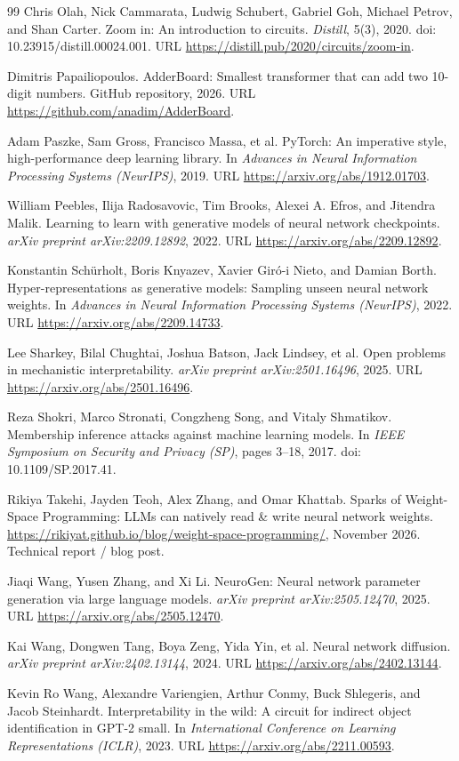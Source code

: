\documentclass[11pt]{article}
\begin{document}
\begin{thebibliography}{99}
 Chris Olah, Nick Cammarata, Ludwig Schubert, Gabriel Goh, Michael Petrov, and Shan Carter. Zoom in: An introduction to circuits. \emph{Distill}, 5(3), 2020. doi: 10.23915/distill.00024.001. URL \url{https://distill.pub/2020/circuits/zoom-in}.

 Dimitris Papailiopoulos. AdderBoard: Smallest transformer that can add two 10-digit numbers. GitHub repository, 2026. URL \url{https://github.com/anadim/AdderBoard}.

 Adam Paszke, Sam Gross, Francisco Massa, et al. PyTorch: An imperative style, high-performance deep learning library. In \emph{Advances in Neural Information Processing Systems (NeurIPS)}, 2019. URL \url{https://arxiv.org/abs/1912.01703}.

 William Peebles, Ilija Radosavovic, Tim Brooks, Alexei A. Efros, and Jitendra Malik. Learning to learn with generative models of neural network checkpoints. \emph{arXiv preprint arXiv:2209.12892}, 2022. URL \url{https://arxiv.org/abs/2209.12892}.

 Konstantin Sch\"urholt, Boris Knyazev, Xavier Gir\'o-i Nieto, and Damian Borth. Hyper-representations as generative models: Sampling unseen neural network weights. In \emph{Advances in Neural Information Processing Systems (NeurIPS)}, 2022. URL \url{https://arxiv.org/abs/2209.14733}.

 Lee Sharkey, Bilal Chughtai, Joshua Batson, Jack Lindsey, et al. Open problems in mechanistic interpretability. \emph{arXiv preprint arXiv:2501.16496}, 2025. URL \url{https://arxiv.org/abs/2501.16496}.

 Reza Shokri, Marco Stronati, Congzheng Song, and Vitaly Shmatikov. Membership inference attacks against machine learning models. In \emph{IEEE Symposium on Security and Privacy (SP)}, pages 3--18, 2017. doi: 10.1109/SP.2017.41.

 Rikiya Takehi, Jayden Teoh, Alex Zhang, and Omar Khattab. Sparks of Weight-Space Programming: LLMs can natively read \& write neural network weights. \url{https://rikiyat.github.io/blog/weight-space-programming/}, November 2026. Technical report / blog post.

 Jiaqi Wang, Yusen Zhang, and Xi Li. NeuroGen: Neural network parameter generation via large language models. \emph{arXiv preprint arXiv:2505.12470}, 2025. URL \url{https://arxiv.org/abs/2505.12470}.

 Kai Wang, Dongwen Tang, Boya Zeng, Yida Yin, et al. Neural network diffusion. \emph{arXiv preprint arXiv:2402.13144}, 2024. URL \url{https://arxiv.org/abs/2402.13144}.

 Kevin Ro Wang, Alexandre Variengien, Arthur Conmy, Buck Shlegeris, and Jacob Steinhardt. Interpretability in the wild: A circuit for indirect object identification in GPT-2 small. In \emph{International Conference on Learning Representations (ICLR)}, 2023. URL \url{https://arxiv.org/abs/2211.00593}.

\end{thebibliography}
\end{document}
